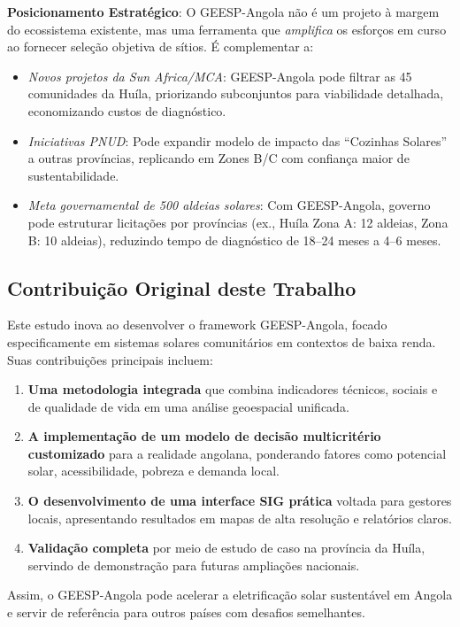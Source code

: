 \documentclass[12pt, a4paper]{article}
\begin{document}
\begin{itemize}
\textbf{Posicionamento Estratégico}: O GEESP-Angola não é um projeto à margem do ecossistema existente, mas uma ferramenta que \textit{amplifica} os esforços em curso ao fornecer seleção objetiva de sítios. É complementar a:
\begin{itemize}
\item \textit{Novos projetos da Sun Africa/MCA}: GEESP-Angola pode filtrar as 45 comunidades da Huíla, priorizando subconjuntos para viabilidade detalhada, economizando custos de diagnóstico.
\item \textit{Iniciativas PNUD}: Pode expandir modelo de impacto das ``Cozinhas Solares'' a outras províncias, replicando em Zones B/C com confiança maior de sustentabilidade.
\item \textit{Meta governamental de 500 aldeias solares}: Com GEESP-Angola, governo pode estruturar licitações por províncias (ex., Huíla Zona A: 12 aldeias, Zona B: 10 aldeias), reduzindo tempo de diagnóstico de 18--24 meses a 4--6 meses.
\end{itemize}

\subsection{Contribuição Original deste Trabalho}

Este estudo inova ao desenvolver o framework GEESP-Angola, focado especificamente em sistemas solares comunitários em contextos de baixa renda. Suas contribuições principais incluem:

\begin{enumerate}
\item \textbf{Uma metodologia integrada} que combina indicadores técnicos, sociais e de qualidade de vida em uma análise geoespacial unificada.
\item \textbf{A implementação de um modelo de decisão multicritério customizado} para a realidade angolana, ponderando fatores como potencial solar, acessibilidade, pobreza e demanda local.
\item \textbf{O desenvolvimento de uma interface SIG prática} voltada para gestores locais, apresentando resultados em mapas de alta resolução e relatórios claros.
\item \textbf{Validação completa} por meio de estudo de caso na província da Huíla, servindo de demonstração para futuras ampliações nacionais.
\end{enumerate}

Assim, o GEESP-Angola pode acelerar a eletrificação solar sustentável em Angola e servir de referência para outros países com desafios semelhantes.


\end{itemize}
\end{document}
